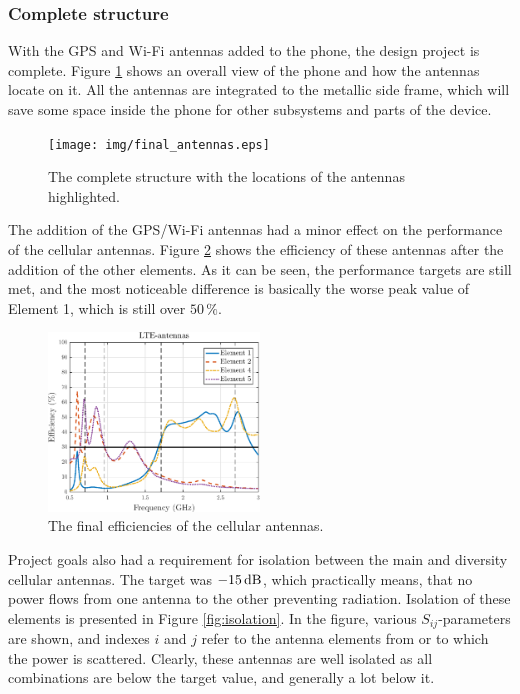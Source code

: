 \subsubsection{Complete structure}
\label{sec:complete_structure}
With the GPS and Wi-Fi antennas added to the phone, the design project is complete. Figure \ref{fig:complete_struct} shows an overall view of the phone and how the antennas locate on it. All the antennas are integrated to the metallic side frame, which will save some space inside the phone for other subsystems and parts of the device.

\begin{figure}[H]
    \centering
    \texttt{[image: img/final\_antennas.eps]}
    \caption{The complete structure with the locations of the antennas highlighted.}
    \label{fig:complete_struct}
\end{figure}

The addition of the GPS/Wi-Fi antennas had a minor effect on the performance of the cellular antennas. Figure \ref{fig:cellular_final_eff} shows the efficiency of these antennas after the addition of the other elements. As it can be seen, the performance targets are still met, and the most noticeable difference is basically the worse peak value of Element 1, which is still over $50\,\%$.
\begin{figure}[H]
    \centering
    \includegraphics[width=0.5\textwidth]{img/diversity_eff_wgps.eps}
    \caption{The final efficiencies of the cellular antennas.}
    \label{fig:cellular_final_eff}
\end{figure}

Project goals also had a requirement for isolation between the main and diversity cellular antennas. The target was $-15\,\mathrm{dB}$, which practically means, that no power flows from one antenna to the other preventing radiation. Isolation of these elements is presented in Figure \ref{fig:isolation}. In the figure, various $S_{ij}$-parameters are shown, and indexes $i$ and $j$ refer to the antenna elements from or to which the power is scattered. Clearly, these antennas are well isolated as all combinations are below the target value, and generally a lot below it.

